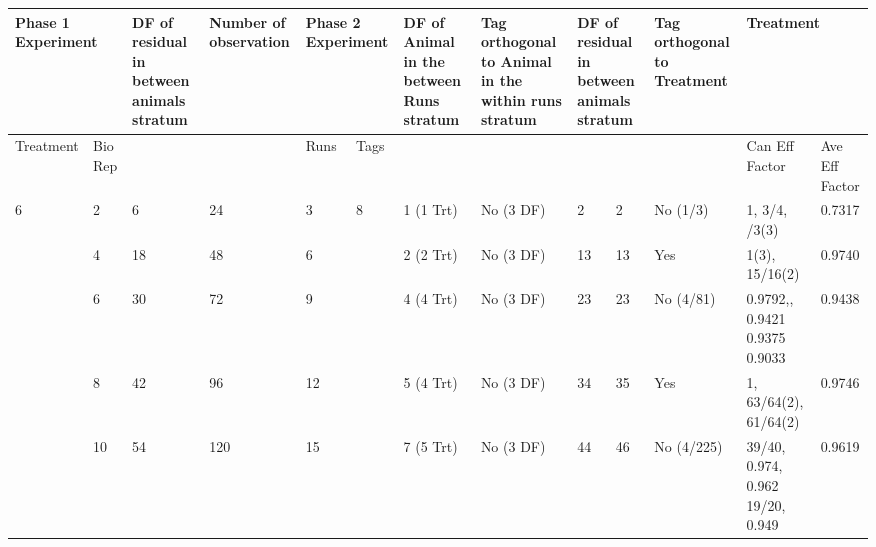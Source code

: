 \begin{tabular}{|p{0.5in}|p{0.3in}|p{0.7in}|p{0.7in}|p{0.3in}|p{0.3in}|p{0.7in}|p{0.7in}|p{0.2in}|p{0.4in}|p{0.6in}|p{0.6in}|p{0.4in}|} \hline 
\multicolumn{2}{|p{1in}|}{Phase 1 Experiment} & DF of residual in between animals stratum & Number of observation  & \multicolumn{2}{|p{0.7in}|}{Phase 2 Experiment} & DF of Animal in the between Runs stratum  & Tag orthogonal to Animal in the within runs stratum & \multicolumn{2}{|p{0.6in}|}{DF of residual in between animals stratum} & Tag orthogonal to Treatment & \multicolumn{2}{|p{1.0in}|}{Treatment} \\ \hline 
Treatment & Bio Rep &  &  & Runs & Tags  &  &  & \multicolumn{2}{|p{0.6in}|}{} &  & Can Eff Factor & Ave Eff Factor \\ \hline 
6 & 2 & 6 & 24 & 3 & 8 & 1 (1 Trt) & No (3 DF) & 2 & 2 & No (1/3) & 1, 3/4, \newline 2/3(3)  & 0.7317 \\ \hline 
 & 4 & 18 & 48 & 6 &  & 2 (2 Trt) & No (3 DF) & 13 & 13 & Yes & 1(3), 15/16(2) & 0.9740 \\ \hline 
 & 6 & 30 & 72 & 9 &  & 4 (4 Trt) & No (3 DF) & 23 & 23 & No (4/81) & 0.9792,\newline 0.9601, 0.9421 0.9375 0.9033 & 0.9438\newline  \\ \hline 
 & 8 & 42 & 96 & 12 &  & 5 (4 Trt) & No (3 DF) & 34 & 35 & Yes & 1, 63/64(2), 61/64(2)  & 0.9746 \\ \hline 
 & 10 & 54 & 120 & 15 &  & 7 (5 Trt) & No (3 DF) & 44 & 46 & No (4/225) & 39/40, 0.974, 0.962 19/20, 0.949 & 0.9619 \\ \hline 
\end{tabular}



\noindent \eject 

\noindent 

